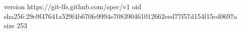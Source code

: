 version https://git-lfs.github.com/spec/v1
oid sha256:29e9f47641a529f4b670fe9994e708390461012662eed77f57d154f15cd0697a
size 253
